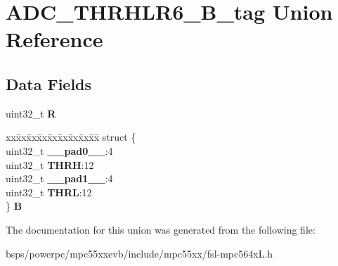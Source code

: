 \hypertarget{unionADC__THRHLR6__32B__tag}{}\section{A\+D\+C\+\_\+\+T\+H\+R\+H\+L\+R6\+\_\+B\+\_\+tag Union Reference}
\label{unionADC__THRHLR6__32B__tag}
\subsection*{Data Fields}
\begin{DoxyCompactItemize}
\item 
\mbox{\label{unionADC__THRHLR6__32B__tag_a449ae84dd3214ff33ff73c6013606c04}} 
uint32\+\_\+t {\bfseries R}
\item 
\mbox{\label{unionADC__THRHLR6__32B__tag_a41b990dc96589680dd8c359081297510}} 
\begin{tabbing}
xx\=xx\=xx\=xx\=xx\=xx\=xx\=xx\=xx\=\kill
struct \{\\
\>uint32\_t {\bfseries \_\_pad0\_\_}:4\\
\>uint32\_t {\bfseries THRH}:12\\
\>uint32\_t {\bfseries \_\_pad1\_\_}:4\\
\>uint32\_t {\bfseries THRL}:12\\
\} {\bfseries B}\\

\end{tabbing}\end{DoxyCompactItemize}


The documentation for this union was generated from the following file\+:\begin{DoxyCompactItemize}
\item 
bsps/powerpc/mpc55xxevb/include/mpc55xx/fsl-\/mpc564x\+L.\+h\end{DoxyCompactItemize}
